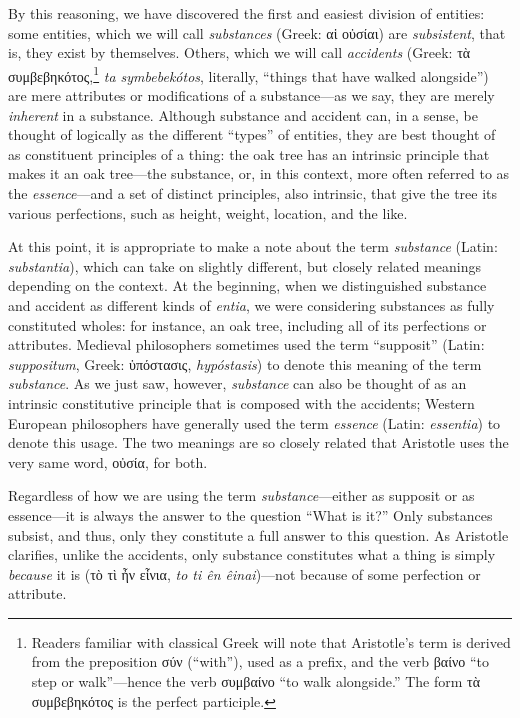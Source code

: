 \documentclass[article,12pt,a4paper,oneside]{memoir}
\begin{document}
    By this reasoning, we have discovered the first and easiest division
    of entities: some entities, which we will call \emph{substances}
    (Greek: αἱ οὐσίαι) are \emph{subsistent}, that is, they exist by
    themselves. Others, which we will call \emph{accidents} (Greek: τὰ
    συμβεβηκότος,\footnote{Readers familiar with classical Greek will
      note that Aristotle's term is derived from the preposition σύν
      (``with''), used as a prefix, and the verb βαίνο ``to step or
      walk''---hence the verb συμβαίνο ``to walk alongside.'' The form
      τὰ συμβεβηκότος is the perfect participle.} \emph{ta
    symbebekótos}, literally, ``things that have walked alongside'') are
    mere attributes or modifications of a substance---as we say, they
    are merely \emph{inherent} in a substance. Although substance and
    accident can, in a sense, be thought of logically as the different
    ``types'' of entities, they are best thought of as constituent
    principles of a thing: the oak tree has an intrinsic principle that
    makes it an oak tree---the substance, or, in this context, more
    often referred to as the \emph{essence}---and a set of distinct
    principles, also intrinsic, that give the tree its various
    perfections, such as height, weight, location, and the like.

    At this point, it is appropriate to make a note about the term
    \emph{substance} (Latin: \emph{substantia}), which can take on
    slightly different, but closely related meanings depending on the
    context. At the beginning, when we distinguished substance and
    accident as different kinds of \emph{entia}, we were considering
    substances as fully constituted wholes: for instance, an oak tree,
    including all of its perfections or attributes. Medieval
    philosophers sometimes used the term ``supposit'' (Latin:
    \emph{suppositum}, Greek: ὑπόστασις, \emph{hypóstasis}) to denote
    this meaning of the term \emph{substance}. As we just saw, however,
    \emph{substance} can also be thought of as an intrinsic constitutive
    principle that is composed with the accidents; Western European
    philosophers have generally used the term \emph{essence} (Latin:
    \emph{essentia}) to denote this usage. The two meanings are so
    closely related that Aristotle uses the very same word, οὐσία, for
    both.

    Regardless of how we are using the term \emph{substance}---either as
    supposit or as essence---it is always the answer to the question
    ``What is it?'' Only substances subsist, and thus, only they
    constitute a full answer to this question. As Aristotle clarifies,
    unlike the accidents, only substance constitutes what a thing is
    simply \emph{because} it is (τὸ τὶ ἦν εἶνια, \emph{to ti ên
    êinai})---not because of some perfection or attribute.
\end{document}
